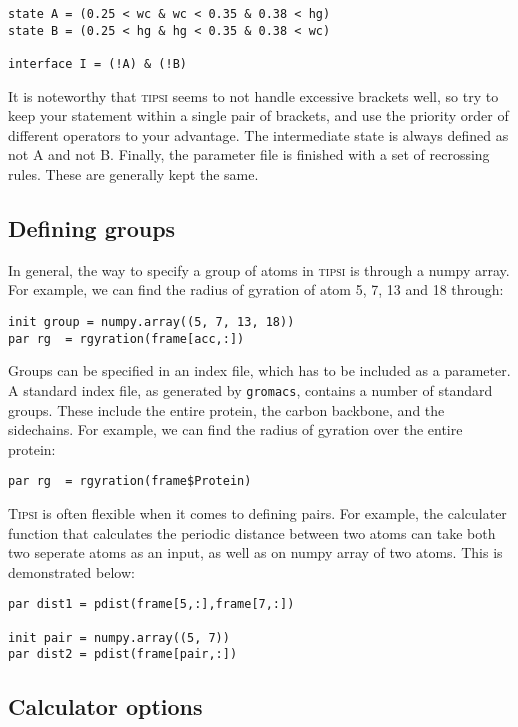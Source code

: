 \documentclass[]{article}
\begin{document}
\begin{lstlisting}
state A = (0.25 < wc & wc < 0.35 & 0.38 < hg)
state B = (0.25 < hg & hg < 0.35 & 0.38 < wc)

interface I = (!A) & (!B)
\end{lstlisting}

It is noteworthy that \textsc{tipsi} seems to not handle excessive brackets well, so try to keep your statement within a single pair of brackets, and use the priority order of different operators to your advantage.
The intermediate state is always defined as not A and not B.
Finally, the parameter file is finished with a set of recrossing rules. These are generally kept the same.

\subsection*{Defining groups}

In general, the way to specify a group of atoms in \textsc{tipsi} is through a numpy array. 
For example, we can find the radius of gyration of atom 5, 7, 13 and 18 through:

\begin{lstlisting}
init group = numpy.array((5, 7, 13, 18))
par rg  = rgyration(frame[acc,:])
\end{lstlisting}

Groups can be specified in an index file, which has to be included as a parameter. 
A standard index file, as generated by \texttt{gromacs}, contains a number of standard groups. 
These include the entire protein, the carbon backbone, and the sidechains. For example, we can find the radius of gyration over the entire protein:

\begin{lstlisting}
par rg  = rgyration(frame$Protein)
\end{lstlisting}

\textsc{Tipsi} is often flexible when it comes to defining pairs. For example, the calculater function that calculates the periodic distance between two atoms can take both two seperate atoms as an input, as well as on numpy array of two atoms. This is demonstrated below:

\begin{lstlisting}
par dist1 = pdist(frame[5,:],frame[7,:])

init pair = numpy.array((5, 7))
par dist2 = pdist(frame[pair,:]) 
\end{lstlisting}

\subsection*{Calculator options}
\end{document}
